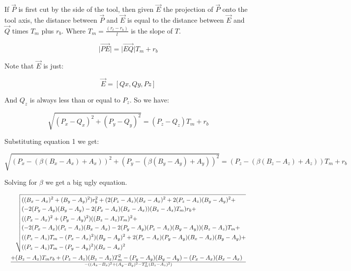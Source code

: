 \documentclass{article}
\newcommand{\norm}[1]{\lvert #1 \rvert}
\begin{document}
If $\vec{P}$ is first cut by the side of the tool, then given $\vec{E}$ the
projection of $\vec{P}$ onto the tool axis, the distance between $\vec{P}$ and
$\vec{E}$ is equal to the distance between $\vec{E}$ and $\vec{Q}$ times $T_m$
plus $r_b$.  Where $T_m=\frac{(r_t - r_b)}{l}$ is the slope of $T$.

\begin{equation*}
\norm{\vec{PE}} = \norm{\vec{EQ}} T_m + r_b
\end{equation*}

Note that $\vec{E}$ is just:

\begin{equation*}
\vec{E} = [Qx, Qy, Pz]
\end{equation*}

And $Q_z$ is always less than or equal to $P_z$.  So we have:

\begin{equation}\label{eq2}
\sqrt{(P_x - Q_x)^2 + (P_y - Q_y)^2} = (P_z - Q_z) T_m + r_b
\end{equation}

Substituting equation 1 we get:

\begin{equation*}
\sqrt{(P_x - (\beta (B_x-A_x) + A_x))^2 + (P_y - (\beta (B_y-A_y) + A_y))^2} =
(P_z - (\beta (B_z - A_z) + A_z)) T_m + r_b
\end{equation*}

Solving for $\beta$ we get a big ugly equation.

\begin{equation*}\resizebox{\hsize}{!}{$
\frac{\begin{aligned}
  & \sqrt{\begin{aligned}
    & ((B_x-A_x)^2 + (B_y-A_y)^2) r_b^2 + (2 (P_z-A_z) (B_x-A_x)^2 + 2 (P_z-A_z)
    (B_y-A_y)^2 + \\ & (-2 (P_y-A_y) (B_y-A_y) - 2 (P_x-A_x) (B_x-A_x))
    (B_z-A_z)T_m) r_b + \\ & ((P_x-A_x)^2 + (P_y-A_y)^2) ((B_z-A_z)T_m)^2 + \\
    & (-2 (P_x-A_x) (P_z-A_z) (B_x-A_x) - 2 (P_y-A_y) (P_z-A_z) (B_y-A_y))
    (B_z-A_z)T_m + \\ & ((P_z-A_z)T_m - (P_x-A_x)^2) (B_y-A_y)^2 +
    2 (P_x-A_x) (P_y-A_y) (B_x-A_x) (B_y-A_y) + \\
    & ((P_z-A_z)T_m - (P_y-A_y)^2) (B_x-A_x)^2
    \end{aligned}
  } \\ +
  & (B_z-A_z)T_m r_b + (P_z-A_z) (B_z-A_z)T_m^2 - (P_y-A_y) (B_y-A_y) -
  (P_x-A_x)(B_x-A_x)
  \end{aligned}
}{
  -((A_x - B_x)^2 + (A_y - B_y)^2 - T_m^2(B_z - A_z)^2)
}
$}\end{equation*}
\end{document}
